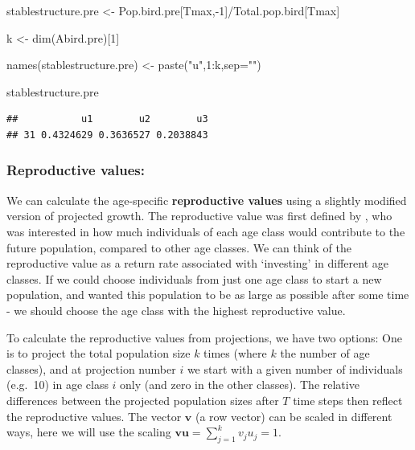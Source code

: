 \documentclass[
]{book}
\newenvironment{Shaded}{\begin{snugshade}}{\end{snugshade}}
\newcommand{\AttributeTok}[1]{\textcolor[rgb]{0.77,0.63,0.00}{#1}}
\newcommand{\DecValTok}[1]{\textcolor[rgb]{0.00,0.00,0.81}{#1}}
\newcommand{\FunctionTok}[1]{\textcolor[rgb]{0.00,0.00,0.00}{#1}}
\newcommand{\NormalTok}[1]{#1}
\newcommand{\OtherTok}[1]{\textcolor[rgb]{0.56,0.35,0.01}{#1}}
\newcommand{\SpecialCharTok}[1]{\textcolor[rgb]{0.00,0.00,0.00}{#1}}
\newcommand{\StringTok}[1]{\textcolor[rgb]{0.31,0.60,0.02}{#1}}
\begin{document}
\begin{Shaded}
\begin{Highlighting}[]
\NormalTok{stablestructure.pre }\OtherTok{\textless{}{-}}\NormalTok{ Pop.bird.pre[Tmax,}\SpecialCharTok{{-}}\DecValTok{1}\NormalTok{]}\SpecialCharTok{/}\NormalTok{Total.pop.bird[Tmax]}

\NormalTok{k }\OtherTok{\textless{}{-}} \FunctionTok{dim}\NormalTok{(Abird.pre)[}\DecValTok{1}\NormalTok{]}

\FunctionTok{names}\NormalTok{(stablestructure.pre) }\OtherTok{\textless{}{-}} \FunctionTok{paste}\NormalTok{(}\StringTok{"u"}\NormalTok{,}\DecValTok{1}\SpecialCharTok{:}\NormalTok{k,}\AttributeTok{sep=}\StringTok{""}\NormalTok{)}

\NormalTok{stablestructure.pre}
\end{Highlighting}
\end{Shaded}

\begin{verbatim}
##           u1        u2        u3
## 31 0.4324629 0.3636527 0.2038843
\end{verbatim}

\hypertarget{reproductive-values}{%
\subsubsection*{Reproductive values:}\label{reproductive-values}}

We can calculate the age-specific \textbf{reproductive values} using a slightly modified version of projected growth. The reproductive value was first defined by \citet{Fisher1}, who was interested in how much individuals of each age class would contribute to the future population, compared to other age classes. We can think of the reproductive value as a return rate associated with `investing' in different age classes. If we could choose individuals from just one age class to start a new population, and wanted this population to be as large as possible after some time - we should choose the age class with the highest reproductive value.

To calculate the reproductive values from projections, we have two options: One is to project the total population size \(k\) times (where \(k\) the number of age classes), and at projection number \(i\) we start with a given number of individuals (e.g.~10) in age class \(i\) only (and zero in the other classes). The relative differences between the projected population sizes after \(T\) time steps then reflect the reproductive values. The vector \(\mathbf{v}\) (a row vector) can be scaled in different ways, here we will use the scaling \(\mathbf{vu}=\sum_{j=1}^kv_ju_j=1\).
\end{document}
